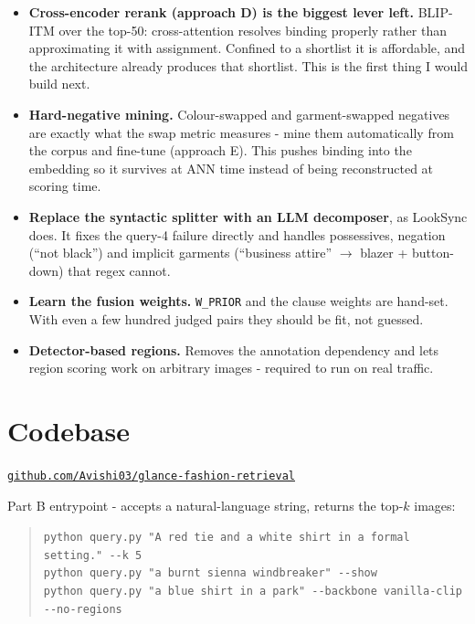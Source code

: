 \documentclass[10pt,a4paper]{article}
\begin{document}
\begin{itemize}
  \item \textbf{Cross-encoder rerank (approach D) is the biggest lever left.} BLIP-ITM
        over the top-50: cross-attention resolves binding properly rather than
        approximating it with assignment. Confined to a shortlist it is affordable, and
        the architecture already produces that shortlist. This is the first thing I would
        build next.
  \item \textbf{Hard-negative mining.} Colour-swapped and garment-swapped negatives are
        exactly what the swap metric measures - mine them automatically from the corpus
        and fine-tune (approach E). This pushes binding into the embedding so it survives
        at ANN time instead of being reconstructed at scoring time.
  \item \textbf{Replace the syntactic splitter with an LLM decomposer}, as LookSync does.
        It fixes the query-4 failure directly and handles possessives, negation (``not
        black'') and implicit garments (``business attire'' $\rightarrow$ blazer +
        button-down) that regex cannot.
  \item \textbf{Learn the fusion weights.} \texttt{W\_PRIOR} and the clause weights are
        hand-set. With even a few hundred judged pairs they should be fit, not guessed.
  \item \textbf{Detector-based regions.} Removes the annotation dependency and lets region
        scoring work on arbitrary images - required to run on real traffic.
\end{itemize}

\section{Codebase}

\begin{center}
\href{https://github.com/Avishi03/glance-fashion-retrieval}{\texttt{github.com/Avishi03/glance-fashion-retrieval}}
\end{center}

Part B entrypoint - accepts a natural-language string, returns the top-$k$ images:

\begin{quote}\small
\texttt{python query.py "A red tie and a white shirt in a formal setting." -{}-k 5}\\
\texttt{python query.py "a burnt sienna windbreaker" -{}-show}\\
\texttt{python query.py "a blue shirt in a park" -{}-backbone vanilla-clip -{}-no-regions}
\end{quote}
\end{document}
